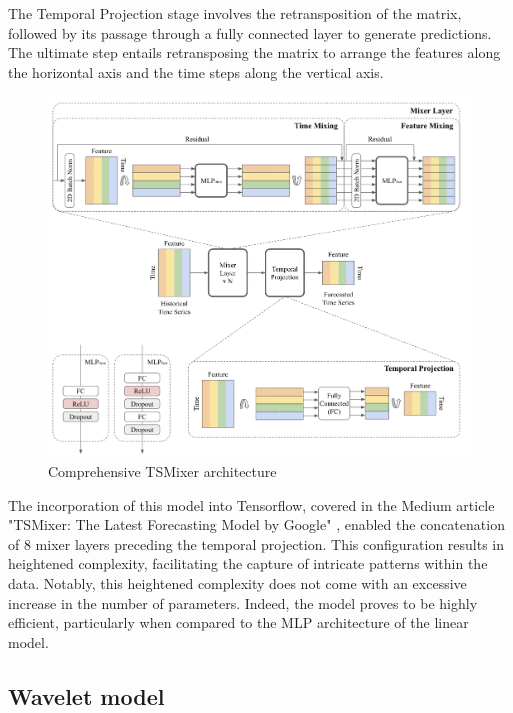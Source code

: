 The Temporal Projection stage involves the retransposition of the matrix, followed by its passage through a fully connected layer to generate predictions. The ultimate step entails retransposing the matrix to arrange the features along the horizontal axis and the time steps along the vertical axis.

\begin{figure}
    \centering
    \includegraphics[width=1\linewidth]{images/model architectures/tsmixermodel.png}
    \caption{Comprehensive TSMixer architecture \cite{chen2023tsmixer}}
    \label{fig:tsmixer-whole architecture}
\end{figure}

The incorporation of this model into Tensorflow, covered in the Medium article "TSMixer: The Latest Forecasting Model by Google" \cite{peixeiro2023tsmixer}, enabled the concatenation of 8 mixer layers preceding the temporal projection. This configuration results in heightened complexity, facilitating the capture of intricate patterns within the data. Notably, this heightened complexity does not come with an excessive increase in the number of parameters. Indeed, the model proves to be highly efficient, particularly when compared to the MLP architecture of the linear model.

\subsection*{Wavelet model}

